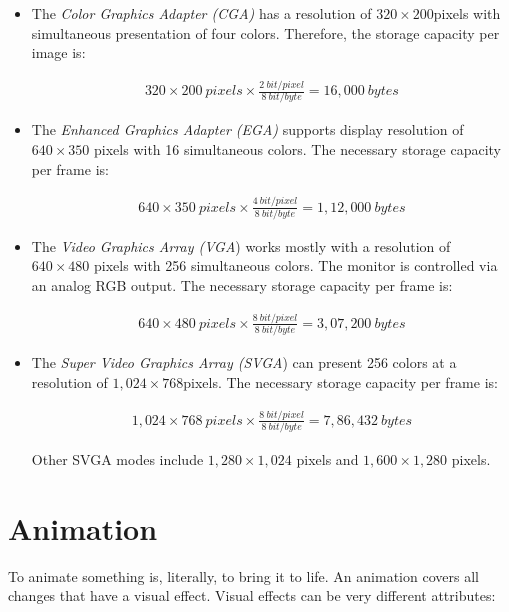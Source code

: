 \begin{itemize}
	\item The \textit{Color Graphics Adapter (CGA)} has a resolution of $ 320 \times 200  $pixels with simultaneous presentation of four colors. Therefore, the storage capacity per image is:
	
	\begin{align*}
		320 \times 200 \: pixels \times \frac{2 \: bit/pixel}{8 \: bit/byte} = 16,000 \: bytes
	\end{align*}

\item The \textit{Enhanced Graphics Adapter (EGA)} supports display resolution of $ 640 \times 350 $ pixels with 16 simultaneous colors. The necessary storage capacity per frame is:

\begin{align*}
	640 \times 350 \: pixels \times \frac{4 \: bit/pixel}{8 \: bit/byte} = 1, 12,000 \: bytes
\end{align*}

\item The \textit{Video Graphics Array (VGA}) works mostly with a resolution of $ 640 \times 480 $ pixels with 256 simultaneous colors. The monitor is controlled via an analog RGB output. The necessary storage capacity per frame is:

\begin{align*}
	640 \times 480 \: pixels \times \frac{8 \: bit/pixel}{8 \: bit/byte} = 3, 07,200 \: bytes
\end{align*}

\item The \textit{Super Video Graphics Array (SVGA}) can present 256 colors at a resolution of $ 1,024 \times 768  $pixels. The necessary storage capacity per frame is:

\begin{align*}
	1,024 \times 768 \: pixels \times \frac{8 \: bit/pixel}{8 \: bit/byte} = 7,86,432 \: bytes
\end{align*}

Other SVGA modes include $ 1,280 \times 1,024 $ pixels and $ 1,600 \times 1,280 $ pixels.

\end{itemize}

\section{Animation}
To animate something is, literally, to bring it to life. An animation covers all changes that have a visual effect. Visual effects can be very different attributes: 

